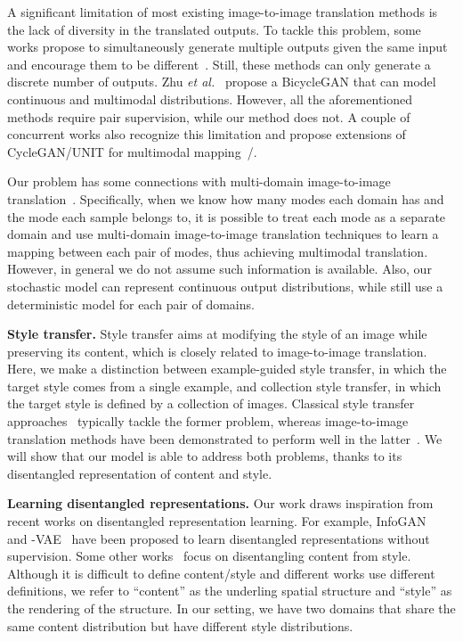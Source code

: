 \documentclass[runningheads]{llncs}
\newcommand{\vpara}[1]{\vspace{0.05in}\noindent\textbf{#1}}
\def\etal{\emph{et al.}\xspace}
\begin{document}
	A significant limitation of most existing image-to-image translation methods is the lack of diversity in the translated outputs. 
To tackle this problem, some works propose to simultaneously generate multiple outputs given the same input and encourage them to be different~\cite{chen2017photographic,ghosh2017multi,bansal2018pixelnn}. Still, these methods can only generate a discrete number of outputs. Zhu \etal~\cite{zhu2017toward} propose a BicycleGAN that can model continuous and multimodal distributions. However, all the aforementioned methods require pair supervision, while our method does not. A couple of concurrent works also recognize this limitation and propose extensions of CycleGAN/UNIT for multimodal mapping~\cite{almahairi2018augmented}/\cite{lee2018diverse}.
	
	Our problem has some connections with multi-domain image-to-image translation~\cite{choi2017stargan,anoosheh2017combogan,hui2017unsupervised}.
	Specifically, when we know how many modes each domain has and the mode each sample belongs to, it is possible to treat each mode as a separate domain and use multi-domain image-to-image translation techniques to learn a mapping between each pair of modes, thus achieving multimodal translation. However, in general we do not assume such information is available. Also, our stochastic model can represent continuous output distributions, while \cite{choi2017stargan,anoosheh2017combogan,hui2017unsupervised} still use a deterministic model for each pair of domains.
	
	\vpara{Style transfer.}  Style transfer aims at modifying the style of an image while preserving its content, which is closely related to image-to-image translation. Here, we make a distinction between example-guided style transfer, in which the target style comes from a single example, and collection style transfer, in which the target style is defined by a collection of images. Classical style transfer approaches~\cite{gatys2016image,hertzmann2001image,li2016combining,johnson2016perceptual,huang2017adain,li2017universal,li2018closed} typically tackle the former problem, whereas image-to-image translation methods have been demonstrated to perform well in the latter~\cite{zhu2017unpaired}. We will show that our model is able to address both problems, thanks to its disentangled representation of content and style.


	\vpara{Learning disentangled representations.} Our work draws inspiration from recent works on disentangled representation learning. For example, InfoGAN~\cite{chen2016infogan} and -VAE~\cite{higgins2017beta} have been proposed to learn disentangled representations without supervision. Some other works~\cite{tenenbaum1997separating,bousmalis2016domain,villegas2017decomposing,mathieu2016disentangling,denton2017unsupervised,tulyakov2018mocogan,donahue2018semantically,shen2017style} focus on disentangling content from style. Although it is difficult to define content/style and different works use different definitions, we refer to ``content'' as the underling spatial structure and ``style'' as the rendering of the structure. In our setting, we have two domains that share the same content distribution but have different style distributions.
\end{document}
